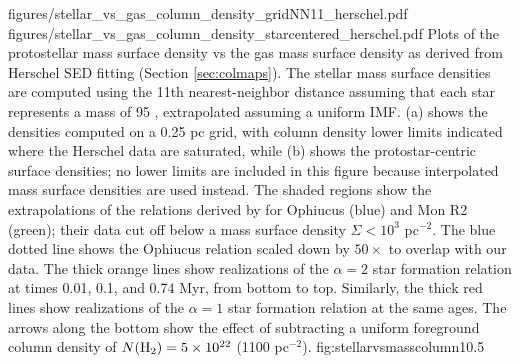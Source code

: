 \documentclass[twocolumn]{aastex61}
\begin{document}
\FigureTwo
{figures/stellar_vs_gas_column_density_gridNN11_herschel.pdf}
{figures/stellar_vs_gas_column_density_starcentered_herschel.pdf}
{Plots of the protostellar mass surface density vs the gas mass surface density
as derived from Herschel SED fitting (Section \ref{sec:colmaps}).  The stellar
mass surface densities are computed using the 11th
nearest-neighbor distance assuming that each star represents
a mass of 95 \msun, extrapolated assuming a uniform IMF.  (a) shows the
densities computed on a 0.25 pc grid, with column density lower limits
indicated where the Herschel data are saturated,
while (b) shows
the protostar-centric surface densities; no lower limits are included in this
figure because interpolated mass surface densities are used instead.  The
shaded regions
show the extrapolations of the relations derived by \citet{Gutermuth2011a}
for Ophiucus (blue) and Mon R2 (green); their data cut off below a mass
surface density $\Sigma < 10^3$ \msun pc$^{-2}$. 
The blue dotted line shows the Ophiucus relation scaled down by
$50\times$ to overlap with our data.
The thick orange lines show realizations of the \citet{Gutermuth2011a} $\alpha=2$ star
formation relation at times 0.01, 0.1, and 0.74 Myr, from bottom to top.
Similarly, the thick red lines show realizations of the $\alpha=1$ star
formation relation at the same ages.
The arrows along
the bottom show the effect of subtracting a uniform foreground column
density of $N(\textrm{H}_{2})=5\times10^{22}$ \persc (1100 \msun pc$^{-2}$).
}
{fig:stellarvsmasscolumn}{1}{0.5\textwidth}
\end{document}

